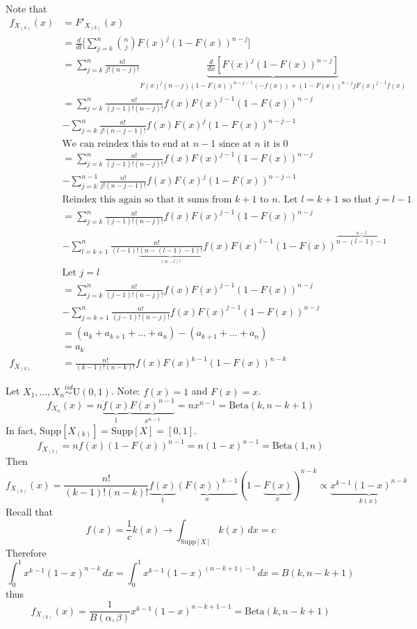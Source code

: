 \documentclass[12pt]{article}
\newcommand{\iid}{\stackrel{iid}{\sim}}
\newcommand{\supp}[1]{\text{Supp}[ #1 ]}
\newcommand{\ostat}[2]{#1_{(#2)}}
\begin{document}
Note that $$ \begin{aligned} f_{\ostat{X}{k}}(x) &= F'_{\ostat{X}{k}}(x) \\ &= \frac{d}{dt} \Big[ \sum_{j = k}^n \binom{n}{j} F(x)^j (1 - F(x))^{n-j}\Big] \\ &= \sum_{j = k}^n \frac{n!}{j!(n - j)!} \underbrace{\frac{d}{dx} [F(x)^j(1 - F(x))^{n - j}]}_{F(x)^j(n - j)(1 - F(x))^{n - j - 1}(-f(x)) + (1 - F(x))^{n - j}jF(x)^{j - 1}f(x)} \\ &= \sum_{j = k}^n \frac{n!}{(j - 1)!(n - j)!} f(x)F(x)^{j - 1}(1 - F(x))^{n - j} \\ &- \sum_{j = k}^n \frac{n!}{j!(n - j - 1)!}f(x)F(x)^j(1 - F(x))^{n - j - 1} \\ &\text{We can reindex this to end at $n - 1$ since at $n$ it is 0} \\ &= \sum_{j = k}^n \frac{n!}{(j - 1)!(n - j)!} f(x)F(x)^{j - 1}(1 - F(x))^{n - j} \\ &- \sum_{j = k}^{n-1} \frac{n!}{j!(n - j - 1)!}f(x)F(x)^j(1 - F(x))^{n - j - 1} \\ &\text{Reindex this again so that it sums from $k+1$ to $n$. Let $l = k +1$ so that $j = l - 1$ } \\ &= \sum_{j = k}^n \frac{n!}{(j - 1)!(n - j)!} f(x)F(x)^{j - 1}(1 - F(x))^{n - j} \\ &- \sum_{l = k+1}^n \frac{n!}{(l - 1)!\underbrace{(n - (l - 1) - 1)!}_{(n - l)!}} f(x)F(x)^{l - 1}(1 - F(x))^{\overbrace{n - (l - 1) - 1}^{n - l}} \\ &\text{Let } j = l \\ &= \sum_{j = k}^n \frac{n!}{(j - 1)!(n - j)!} f(x)F(x)^{j - 1}(1 - F(x))^{n - j} \\ &- \sum_{j = k+1}^n \frac{n!}{(j - 1)!(n - j)!}f(x)F(x)^{j-1}(1 - F(x))^{n - j} \\ &= (a_k + a_{k + 1} + \dots + a_n) - (a_{k + 1} + \dots + a_n) \\ &= a_k \\ f_{\ostat{X}{k}} &= \frac{n!}{(k - 1)!(n - k)!} f(x)F(x)^{k - 1}(1 - F(x))^{n - k} \end{aligned} $$ 

Let $X_1, \dots, X_n \iid \text{U}(0,1)$. Note: $f(x)=1$ and $F(x) = x$. 
$$f_{X_n}(x) = n\underbrace{f(x)}_1\underbrace{F(x)^{n -1}}_{x^{n - 1}} = nx^{n - 1} = \text{Beta}(k,n-k+1)$$ 
In fact, $\supp{\ostat{X}{k}} = \supp{X} = [0,1]$. 
$$f_{\ostat{X}{1}} = nf(x)(1 - F(x))^{n - 1} = n(1 - x)^{n - 1} = \text{Beta}(1,n) $$ 
Then
$$f_{\ostat{X}{k}}(x) = \frac{n!}{(k - 1)!(n - k)!}\underbrace{f(x)}_1\underbrace{(F(x))^{k - 1}}_x(1 - \underbrace{F(x)}_x)^{n - k} \propto \underbrace{x^{k - 1}(1 - x)^{n - k}}_{k(x)} $$ 
Recall that  
$$f(x) = \frac{1}{c}k(x) \to \int_{\supp{X}} k(x) \, dx = c $$ 
Therefore $$ \int_0^1 x^{k -1}(1 - x)^{n - k} \, dx = \int_0^1 x^{k - 1}(1 - x)^{(n - k + 1) - 1} \, dx = B(k, n - k + 1) $$ 
thus $$f_{\ostat{X}{k}}(x) = \frac{1}{B(\alpha, \beta)} x^{k - 1} (1 - x)^{n - k + 1 - 1} = \text{Beta}(k, n - k + 1) $$ 
\end{document}
